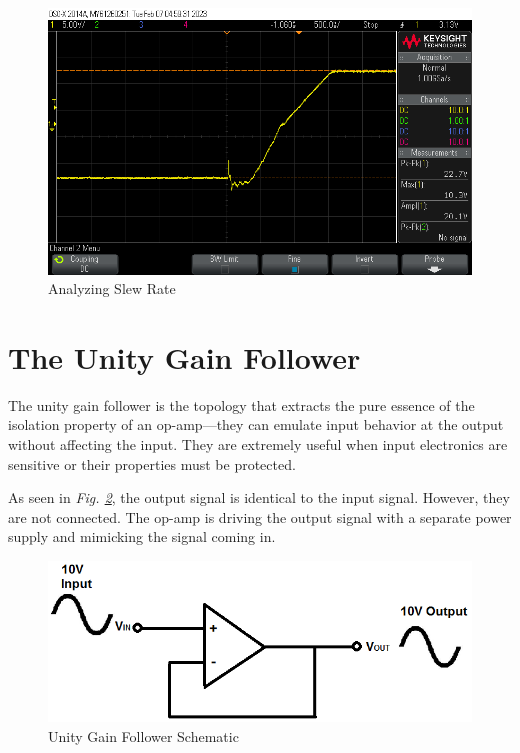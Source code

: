 \documentclass[journal]{IEEEtran}
\begin{document}
\begin{figure}[h]
    \includegraphics[scale=0.3]{Media/slew_rate.png}
    \caption[short]{Analyzing Slew Rate}
    \label{fig:osc_slew_rate}
\end{figure}

\section{The Unity Gain Follower}
The unity gain follower is the topology that extracts the pure essence of the isolation property of an op-amp---they can emulate input behavior at the output without affecting the input. They are extremely useful when input electronics are sensitive or their properties must be protected.

As seen in \textit{Fig. \ref{fig:sch_unity_gain}}, the output signal is identical to the input signal. However, they are not connected. The op-amp is driving the output signal with a separate power supply and mimicking the signal coming in.

\begin{figure}[h]
    \includegraphics[scale=0.45]{Media/Voltage-follower-example.png}
    \caption[short]{Unity Gain Follower Schematic}
    \label{fig:sch_unity_gain}
\end{figure}
\end{document}

